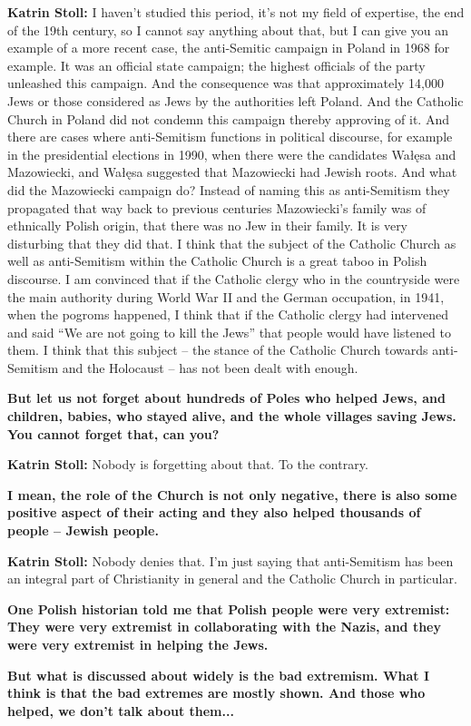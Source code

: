 \textbf{Katrin Stoll:} I haven’t studied this period, it’s not my field of expertise, the end of the 19th century, so I cannot say anything about that, but I can give you an example of a more recent case, the anti-Semitic campaign in Poland in 1968 for example. It was an official state campaign; the highest officials of the party unleashed this campaign. And the consequence was that approximately 14,000 Jews or those considered as Jews by the authorities left Poland. And the Catholic Church in Poland did not condemn this campaign thereby approving of it. And there are cases where anti-Semitism functions in political discourse, for example in the presidential elections in 1990, when there were the candidates Wałęsa and Mazowiecki, and Wałęsa suggested that Mazowiecki had Jewish roots. And what did the Mazowiecki campaign do? Instead of naming this as anti-Semitism they propagated that way back to previous centuries Mazowiecki’s family was of ethnically Polish origin, that there was no Jew in their family. It is very disturbing that they did that. I think that the subject of the Catholic Church as well as anti-Semitism within the Catholic Church is a great taboo in Polish discourse. I am convinced that if the Catholic clergy who in the countryside were the main authority during World War II and the German occupation, in 1941, when the pogroms happened, I think that if the Catholic clergy had intervened and said "`We are not going to kill the Jews"' that people would have listened to them. I think that this subject – the stance of the Catholic Church towards anti-Semitism and the Holocaust – has not been dealt with enough. 

\textbf{But let us not forget about hundreds of Poles who helped Jews, and children, babies, who stayed alive, and the whole villages saving Jews. You cannot forget that, can you?}

\textbf{Katrin Stoll:} Nobody is forgetting about that. To the contrary.  

\textbf{I mean, the role of the Church is not only negative, there is also some positive aspect of their acting and they also helped thousands of people – Jewish people.} 

\textbf{Katrin Stoll:} Nobody denies that. I’m just saying that anti-Semitism has been an integral part of Christianity in general and the Catholic Church in particular.  

\textbf{One Polish historian told me that Polish people were very extremist: They were very extremist in collaborating with the Nazis, and they were very extremist in helping the Jews.}\par 
\textbf{But what is discussed about widely is the bad extremism. What I think is that the bad extremes are mostly shown. And those who helped, we don’t talk about them...}

